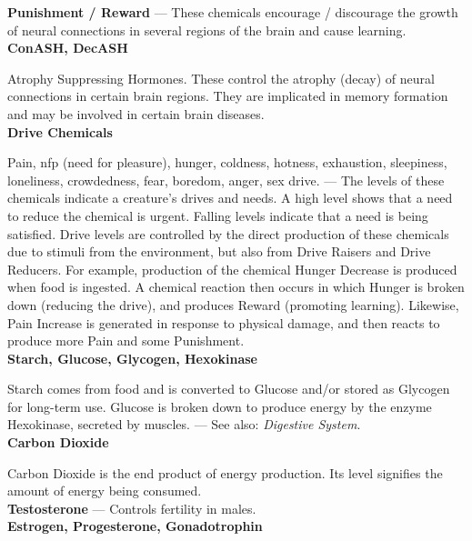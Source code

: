 \documentclass[11pt,twoside,a4paper]{article}
\begin{document}
\textbf{Punishment / Reward} --- These chemicals encourage / discourage the growth of neural connections in several regions of the brain and cause learning. ~\\

\textbf{ConASH, DecASH} %

Atrophy Suppressing Hormones. These control the atrophy (decay) of neural connections in certain brain regions. They are implicated in memory formation and may be involved in certain brain diseases. ~\\

\textbf{Drive Chemicals} %

Pain, nfp (need for pleasure), hunger, coldness, hotness, exhaustion, sleepiness, loneliness, crowdedness, fear, boredom, anger, sex drive. --- The levels of these chemicals indicate a creature's drives and needs. A high level shows that a need to reduce the chemical is urgent. Falling levels indicate that a need is being satisfied. Drive levels are controlled by the direct production of these chemicals due to stimuli from the environment, but also from Drive Raisers and Drive Reducers. For example, production of the chemical Hunger Decrease is produced when food is ingested. A chemical reaction then occurs in which Hunger is broken down (reducing the drive), and produces Reward (promoting learning). Likewise, Pain Increase is generated in response to physical damage, and then reacts to produce more Pain and some Punishment. ~\\

\textbf{Starch, Glucose, Glycogen, Hexokinase} %

Starch comes from food and is converted to Glucose and/or stored as Glycogen for long-term use. Glucose is broken down to produce energy by the enzyme Hexokinase, secreted by muscles. --- See also: \emph{Digestive System}. ~\\

\textbf{Carbon Dioxide} %

Carbon Dioxide is the end product of energy production. Its level signifies the amount of energy being consumed. ~\\

\textbf{Testosterone} --- Controls fertility in males. ~\\

\textbf{Estrogen, Progesterone, Gonadotrophin} %
\end{document}
